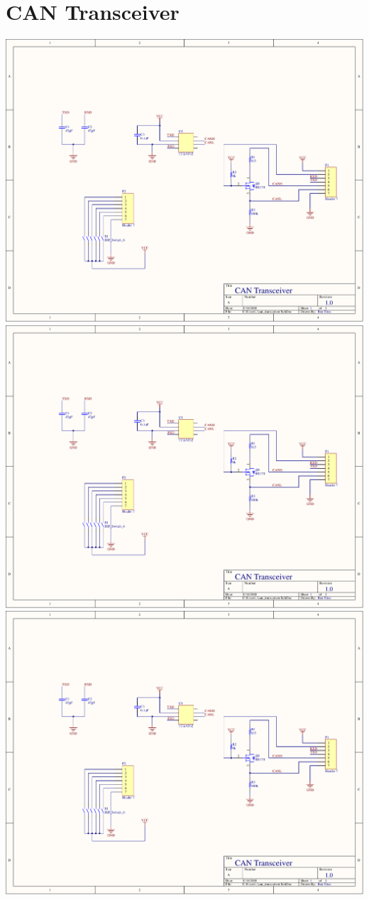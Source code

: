 \section{CAN Transceiver}
\label{app:can_transceiver}
\centering
\includegraphics[page=1,width=\textwidth,angle=270]{PDFs/can_transceiver.PDF} \newpage
\includegraphics[page=2,width=\textwidth,angle=270]{PDFs/can_transceiver.PDF} \newpage
\includegraphics[page=3,width=\textwidth,angle=270]{PDFs/can_transceiver.PDF} \newpage
